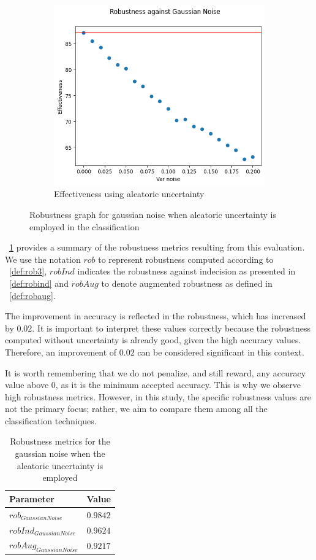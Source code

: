 \begin{figure}[h]
\begin{subfigure}{.33\textwidth}
	\centering
	\includegraphics[width=0.9\linewidth]{ImageFiles/EvalBNN/GN/AU/eff}
	\caption{Effectiveness using aleatoric uncertainty}
	\label{fig:gn_au_eff}
	\end{subfigure}
	\caption{Robustness graph for gaussian noise when aleatoric uncertainty is employed in the classification}
	\label{fig:gn_au}
\end{figure}

\Tab~\ref{table:rob_gn_au} provides a summary of the robustness metrics resulting from this evaluation. We use the notation $rob$ to represent robustness computed according to \Def~\ref{def:rob3}, $robInd$ indicates the robustness against indecision as presented in \Def~\ref{def:robind} and $robAug$ to denote augmented robustness as defined in \Def~\ref{def:robaug}.

The improvement in accuracy is reflected in the robustness, which has increased by $0.02$. It is important to interpret these values correctly because the robustness computed without uncertainty is already good, given the high accuracy values. Therefore, an improvement of $0.02$ can be considered significant in this context.

It is worth remembering that we do not penalize, and still reward, any accuracy value above $0$, as it is the minimum accepted accuracy. This is why we observe high robustness metrics. However, in this study, the specific robustness values are not the primary focus; rather, we aim to compare them among all the classification techniques.

\begin{table}[h]
	\centering
	\begin{tabular}{|| l | l ||} 
		\hline
		\textbf{Parameter} & \textbf{Value} \\
		\hline
		\hline
		$rob_{GaussianNoise}$ & $0.9842$ \\
		$robInd_{GaussianNoise}$ & $0.9624$ \\
		$robAug_{GaussianNoise}$ & $0.9217$ \\	
		\hline
	\end{tabular}	
	\caption{Robustness metrics for the gaussian noise when the aleatoric uncertainty is employed}
	\label{table:rob_gn_au}
\end{table}

